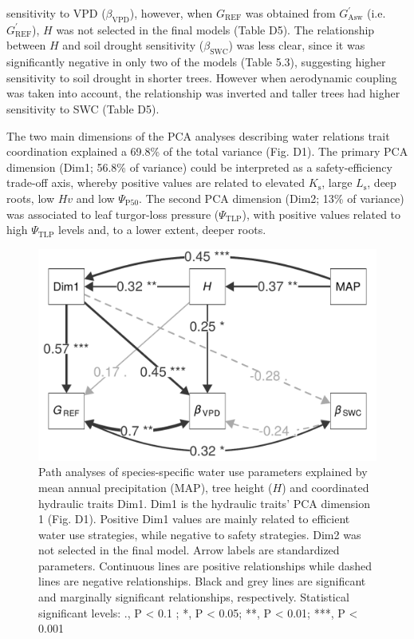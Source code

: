 \documentclass[11pt,twoside]{reedthesis}
\begin{document}
sensitivity to VPD (\(\beta_{\text{VPD}}\)), however, when
\(G_{\text{REF}}\) was obtained from \(G_{\text{Asw}}^{'}\) (i.e.
\(G_{\text{REF}}^{'}\)), \(H\) was not selected in the final models
(Table D5). The relationship between \(H\) and soil drought sensitivity
(\(\beta_{\text{SWC}}\)) was less clear, since it was significantly
negative in only two of the models (Table 5.3), suggesting higher
sensitivity to soil drought in shorter trees. However when aerodynamic
coupling was taken into account, the relationship was inverted and
taller trees had higher sensitivity to SWC (Table D5).\par

The two main dimensions of the PCA analyses describing water relations
trait coordination explained a 69.8\% of the total variance (Fig. D1).
The primary PCA dimension (Dim1; 56.8\% of variance) could be
interpreted as a safety-efficiency trade-off axis, whereby positive
values are related to elevated \(K_\text{s}\), large \(L_\text{s}\),
deep roots, low \(Hv\) and low
\textbar{}\(\Psi_{\text{P50}}\)\textbar{}. The second PCA dimension
(Dim2; 13\% of variance) was associated to leaf turgor-loss pressure
(\(\Psi_{\text{TLP}}\)), with positive values related to high
\textbar{}\(\Psi_{\text{TLP}}\)\textbar{} levels and, to a lower extent,
deeper roots.\par
\begin{figure}[hbt!]

{\centering \includegraphics[width=0.8\linewidth]{figure/CH5/Figure_6} 

}

\caption[Path analyses of species-specific water use parameters.]{Path analyses of species-specific water use parameters explained by mean annual precipitation (MAP), tree height ($H$) and coordinated hydraulic traits Dim1. Dim1 is the hydraulic traits’ PCA dimension 1 (Fig. D1). Positive Dim1 values are mainly related to efficient water use strategies, while negative to safety strategies. Dim2 was not selected in the final model. Arrow labels are standardized parameters. Continuous lines are positive relationships while dashed lines are negative relationships. Black and grey lines are significant and marginally significant relationships, respectively. Statistical significant levels: ., P < 0.1 ; *, P < 0.05; **, P < 0.01; ***, P < 0.001}\label{fig:ch5fig6}
\end{figure}
\end{document}
